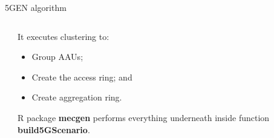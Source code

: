\documentclass{beamer}
\begin{document}
\begin{frame}{5GEN algorithm}
\begin{columns}[T]
\begin{column}{0.4\textwidth}
{\begin{minipage}{2.3\textwidth}
            \end{minipage}
            }
        \end{column}
        \begin{column}{0.58\textwidth}
            \vspace{3em}
            It executes clustering to:
            \begin{itemize}
                \item Group AAUs;
                \item Create the access ring; and
                \item Create aggregation ring.
            \end{itemize}
            \vspace{0.5em}

            R package \textbf{mecgen} performs everything underneath inside function \textbf{build5GScenario}.
        \end{column}
    \end{columns}
\end{frame}
\end{document}
